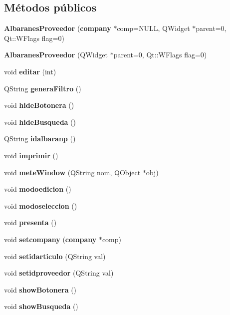 \subsection*{M\'{e}todos p\'{u}blicos}
\begin{CompactItemize}
\item 
{\bf Albaranes\-Proveedor} ({\bf company} $\ast$comp=NULL, QWidget $\ast$parent=0, Qt::WFlags flag=0)\label{classAlbaranesProveedor_a0}

\item 
{\bf Albaranes\-Proveedor} (QWidget $\ast$parent=0, Qt::WFlags flag=0)\label{classAlbaranesProveedor_a1}

\item 
void {\bf editar} (int)\label{classAlbaranesProveedor_a2}

\item 
QString {\bf genera\-Filtro} ()
\item 
void {\bf hide\-Botonera} ()\label{classAlbaranesProveedor_a4}

\item 
void {\bf hide\-Busqueda} ()\label{classAlbaranesProveedor_a5}

\item 
QString {\bf idalbaranp} ()\label{classAlbaranesProveedor_a6}

\item 
void {\bf imprimir} ()\label{classAlbaranesProveedor_a7}

\item 
void {\bf mete\-Window} (QString nom, QObject $\ast$obj)\label{classAlbaranesProveedor_a8}

\item 
void {\bf modoedicion} ()\label{classAlbaranesProveedor_a9}

\item 
void {\bf modoseleccion} ()\label{classAlbaranesProveedor_a10}

\item 
void {\bf presenta} ()
\item 
void {\bf setcompany} ({\bf company} $\ast$comp)\label{classAlbaranesProveedor_a12}

\item 
void {\bf setidarticulo} (QString val)\label{classAlbaranesProveedor_a13}

\item 
void {\bf setidproveedor} (QString val)\label{classAlbaranesProveedor_a14}

\item 
void {\bf show\-Botonera} ()\label{classAlbaranesProveedor_a15}

\item 
void {\bf show\-Busqueda} ()\label{classAlbaranesProveedor_a16}

\end{CompactItemize}


